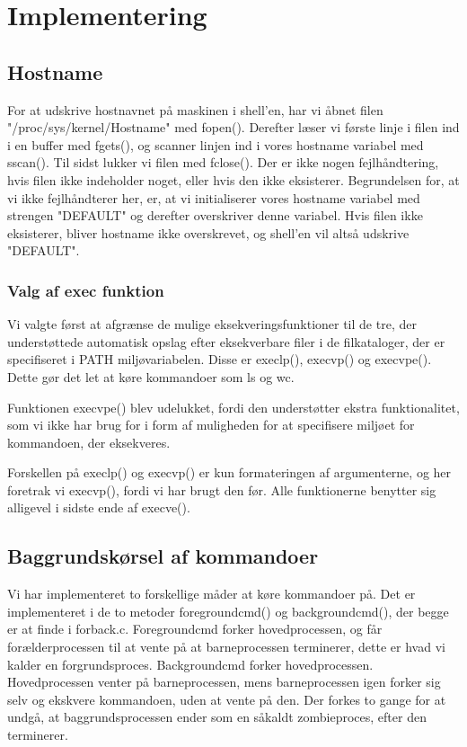 \section{Implementering}

\subsection{Hostname}
For at udskrive hostnavnet på maskinen i shell'en, har vi åbnet filen "/proc/sys/kernel/Hostname" med fopen(). Derefter læser vi første linje i filen ind i en buffer med fgets(), og scanner linjen ind i vores hostname variabel med sscan(). Til sidst lukker vi filen med fclose(). Der er ikke nogen fejlhåndtering, hvis filen ikke indeholder noget, eller hvis den ikke eksisterer. Begrundelsen for, at vi ikke fejlhåndterer her, er, at vi initialiserer vores hostname variabel med strengen "DEFAULT" og derefter overskriver denne variabel. Hvis filen ikke eksisterer, bliver hostname ikke overskrevet, og shell'en vil altså udskrive "DEFAULT".

\subsubsection{Valg af exec funktion}
Vi valgte først at afgrænse de mulige eksekveringsfunktioner til de tre, der understøttede automatisk opslag efter eksekverbare filer i de filkataloger, der er specifiseret i PATH miljøvariabelen. Disse er execlp(), execvp() og execvpe(). Dette gør det let at køre kommandoer som ls og wc.

Funktionen execvpe() blev udelukket, fordi den understøtter ekstra funktionalitet, som vi ikke har brug for i form af muligheden for at specifisere miljøet for kommandoen, der eksekveres.

Forskellen på execlp() og execvp() er kun formateringen af argumenterne, og her foretrak vi execvp(), fordi vi har brugt den før.
Alle funktionerne benytter sig alligevel i sidste ende af execve().

\subsection{Baggrundskørsel af kommandoer}
Vi har implementeret to forskellige måder at køre kommandoer på. Det er implementeret i de to metoder foregroundcmd() og backgroundcmd(), der begge er at finde i forback.c. Foregroundcmd forker hovedprocessen, og får forælderprocessen til at vente på at barneprocessen terminerer, dette er hvad vi kalder en forgrundsproces. 
Backgroundcmd forker hovedprocessen. Hovedprocessen venter på barneprocessen, mens barneprocessen igen forker sig selv og ekskvere kommandoen, uden at vente på den. Der forkes to gange for at undgå, at baggrundsprocessen ender som en såkaldt zombieproces, efter den terminerer.  

